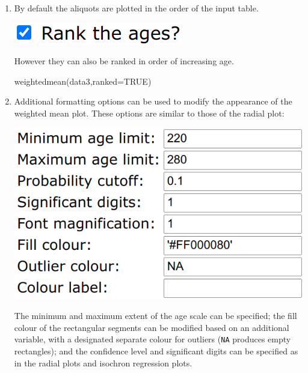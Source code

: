 \begin{refsection}
\begin{enumerate}
\item By default the aliquots are plotted in the order of the input
  table.

\noindent\begin{minipage}[t]{.2\linewidth}
\strut\vspace*{-\baselineskip}\newline
  \includegraphics[width=\linewidth]{../figures/OtherWtdMeanRank.png}
\end{minipage}
\begin{minipage}[t]{.8\linewidth}
However they can also be ranked in order of increasing age.
\end{minipage}

\begin{console}
weightedmean(data3,ranked=TRUE)
\end{console}

\item Additional formatting options can be used to modify the
  appearance of the weighted mean plot. These options are similar to
  those of the radial plot:

\noindent\begin{minipage}[t]{.42\linewidth}
\strut\vspace*{-\baselineskip}\newline
  \includegraphics[width=\linewidth]{../figures/OtherWtdMeanRemainingOptions.png}
\end{minipage}
\begin{minipage}[t]{.58\linewidth}
  The minimum and maximum extent of the age scale can be specified;
  the fill colour of the rectangular segments can be modified based on
  an additional variable, with a designated separate colour for
  outliers (\texttt{NA} produces empty rectangles); and the confidence
  level and significant digits can be specified as in the radial plots
  and isochron regression plots.
\end{minipage}


\end{enumerate}
\end{refsection}
